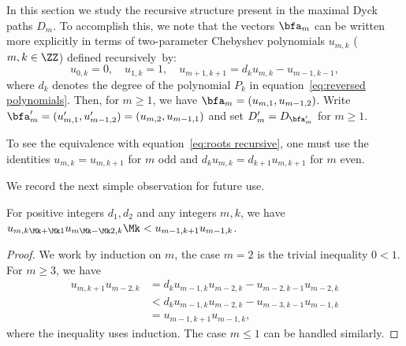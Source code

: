 In this section we study the recursive structure present in the maximal Dyck paths $D_m$. 
To accomplish this, we note that the vectors $\bfa_m$ can be written more explicitly in terms of two-parameter Chebyshev polynomials $u_{m,k}$ ($m,k\in \ZZ$) defined recursively~by: 
\begin{equation}
 \label{eq:chebyshev}
 u_{0,k}=0,\quad
 u_{1,k}=1,\quad
 u_{m+1,k+1}=d_ku_{m,k}-u_{m-1,k-1},
\end{equation}
where $d_k$ denotes the degree of the polynomial $P_k$ in equation~\eqref{eq:reversed polynomials}. 
Then, for $m\ge 1$, we have $\bfa_m=(u_{m,1},u_{m-1,2})$. Write $\bfa'_m=(u'_{m,1},u'_{m-1,2})=(u_{m,2},u_{m-1,1})$ and set $D'_m=D_{\bfa'_m}$ for $m\ge1$. 
\begin{remark}
 \label{rem:chebyshev}
 To see the equivalence with equation~\eqref{eq:roots recursive}, one must use the identities $u_{m,k}=u_{m,k+1}$ for $m$ odd and $d_ku_{m,k}=d_{k+1}u_{m,k+1}$ for $m$ even.
\end{remark}
We record the next simple observation for future use.
\begin{lemma}
 \label{le:Dyck path inequality}
 For positive integers $d_1,d_2$ and any integers $m,k$, we have $u_{m,k\Mk +\Mk 1}u_{m\Mk -\Mk 2,k}\Mk <u_{m-1,k+1}u_{m-1,k}$.
\end{lemma}
\begin{proof}
 We work by induction on $m$, the case $m=2$ is the trivial inequality $0<1$. 
 For $m\ge3$, we have
 \begin{align*}
 u_{m,k+1}u_{m-2,k}
 &=d_ku_{m-1,k}u_{m-2,k}-u_{m-2,k-1}u_{m-2,k}\\
 &<d_ku_{m-1,k}u_{m-2,k}-u_{m-3,k-1}u_{m-1,k}\\
 &=u_{m-1,k+1}u_{m-1,k},
 \end{align*}
 where the inequality uses induction.
 The case $m\le 1$ can be handled similarly.
\end{proof}

